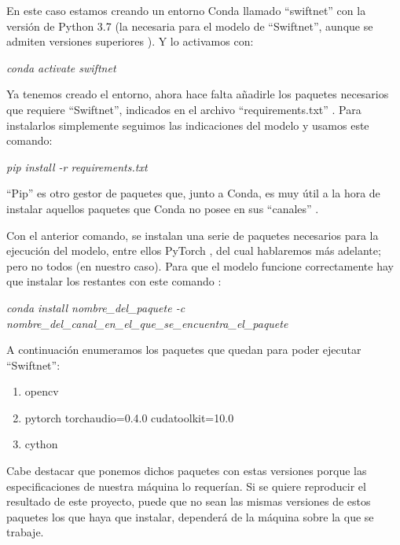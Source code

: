 En este caso estamos creando un entorno Conda llamado ``swiftnet'' con la versión de Python 3.7 (la necesaria para el modelo de ``Swiftnet'', aunque se admiten versiones superiores  \cite{github_swiftnet}). Y lo activamos con:

\begin{center}
\textit{conda activate swiftnet}
\end{center}

Ya tenemos creado el entorno, ahora hace falta añadirle los paquetes necesarios que requiere ``Swiftnet'', indicados en el archivo ``requirements.txt'' \cite{github_swiftnet}. Para instalarlos simplemente seguimos las indicaciones del modelo y usamos este comando:

\begin{center}
\textit{pip install -r requirements.txt}
\end{center}

``Pip'' es otro gestor de paquetes que, junto a Conda, es muy útil a la hora de instalar aquellos paquetes que Conda no posee en sus ``canales'' \cite{pip}.

Con el anterior comando, se instalan una serie de paquetes necesarios para la ejecución del modelo, entre ellos PyTorch \cite{pytorch}, del cual hablaremos más adelante; pero no todos (en nuestro caso). Para que el modelo funcione correctamente hay que instalar los restantes con este comando \cite{conda_sheet}:

\begin{center}
\textit{conda install nombre\_del\_paquete -c nombre\_del\_canal\_en\_el\_que\_se\_encuentra\_el\_paquete}
\end{center}

A continuación enumeramos los paquetes que quedan para poder ejecutar ``Swiftnet'':

\begin{enumerate}
\item opencv \cite{opencv}
\item pytorch torchaudio=0.4.0 cudatoolkit=10.0 \cite{pytorch}
\item cython
\end{enumerate}

Cabe destacar que ponemos dichos paquetes con estas versiones porque las especificaciones de nuestra máquina lo requerían. Si se quiere reproducir el resultado de este proyecto, puede que no sean las mismas versiones de estos paquetes los que haya que instalar, dependerá de la máquina sobre la que se trabaje.

